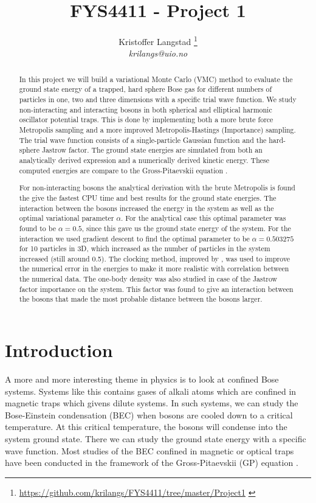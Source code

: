\documentclass[12pt,a4paper,english]{article}
\title{FYS4411 - Project 1}
\date{}
\author{ Kristoffer Langstad \footnote{\url{https://github.com/krilangs/FYS4411/tree/master/Project1} \cite{GitHub}}\\ \textit{krilangs@uio.no}}
\begin{document}
\maketitle
\begin{abstract}
In this project we will build a variational Monte Carlo (VMC) method to evaluate the ground state energy of a trapped, hard sphere Bose gas for different numbers of particles in one, two and three dimensions with a specific trial wave function. We study non-interacting and interacting bosons in both spherical and elliptical harmonic oscillator potential traps. This is done by implementing both a more brute force Metropolis sampling and a more improved Metropolis-Hastings (Importance) sampling. The trial wave function consists of a single-particle Gaussian function and the hard-sphere Jastrow factor. The ground state energies are simulated from both an analytically derived expression and a numerically derived kinetic energy. These computed energies are compare to the Gross-Pitaevskii equation \cite{nilsen2005vortices}.

For non-interacting bosons the analytical derivation with the brute Metropolis is found the give the fastest CPU time and best results for the ground state energies. The interaction between the bosons increased the energy in the system as well as the optimal variational parameter $\alpha$. For the analytical case this optimal parameter was found to be $\alpha=0.5$, since this gave us the ground state energy of the system. For the interaction we used gradient descent to find the optimal parameter to be $\alpha=0.503275$ for 10 particles in 3D, which increased  as the number of particles in the system increased (still around 0.5). The clocking method, improved by \citet{jonsson2018standard}, was used to improve the numerical error in the energies to make it more realistic with correlation between the numerical data. The one-body density was also studied in case of the Jastrow factor importance on the system. This factor was found to give an interaction between the bosons that made the most probable distance between the bosons larger.
\end{abstract}

\section{Introduction}
\label{sect:Introduction}
A more and more interesting theme in physics is to look at confined Bose systems. Systems like this contains gases of alkali atoms which are confined in magnetic traps which givens dilute systems. In such systems, we can study the Bose-Einstein condensation (BEC) when bosons are cooled down to a critical temperature. At this critical temperature, the bosons will condense into the system ground state. There we can study the ground state energy with a specific wave function. Most studies of the BEC confined in magnetic or optical traps have been conducted in the framework of the Gross-Pitaevskii (GP) equation \cite{nilsen2005vortices}.
\end{document}

